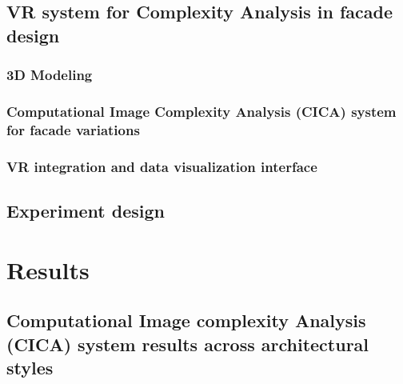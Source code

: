 \documentclass[final,5p,times]{elsarticle}
\begin{document}
\begin{linenumbers}
    \subsection{VR system for Complexity Analysis in facade design}
    \label{subsec:VRsystemDevelopment}
    

    \subsubsection{3D Modeling}
    \label{subsubsec:Modeling}
    

    \subsubsection{Computational Image Complexity Analysis (CICA) system for facade variations}
    \label{subsubsec:CICAforFacades}
    

    \subsubsection{VR integration and data visualization interface}
    \label{subsubsec:VR_integration}
    

    \subsection{Experiment design}
    \label{subsec:Experiment_design}
    

\section{Results}
\label{sec:Results}


    \subsection{Computational Image complexity Analysis (CICA) system results across architectural styles}
    \label{subsec:ResultsComplexityImageAnalysishistory}
    


\end{linenumbers}
\end{document}
